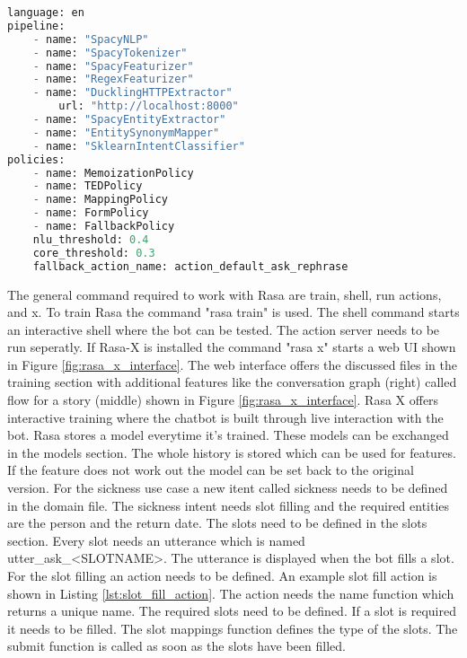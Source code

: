 \begin{lstlisting}[caption={Rasa Configuration}, label={lst:rasa_config},captionpos=b,frame=single,language={Python},commentstyle=\color{mygreen},keywordstyle=\color{blue},
    morekeywords={language, pipeline, policies, name}]                
language: en
pipeline: 
    - name: "SpacyNLP"
    - name: "SpacyTokenizer"
    - name: "SpacyFeaturizer"
    - name: "RegexFeaturizer"
    - name: "DucklingHTTPExtractor"
        url: "http://localhost:8000"
    - name: "SpacyEntityExtractor"
    - name: "EntitySynonymMapper"
    - name: "SklearnIntentClassifier"
policies:
    - name: MemoizationPolicy
    - name: TEDPolicy
    - name: MappingPolicy
    - name: FormPolicy
    - name: FallbackPolicy
    nlu_threshold: 0.4
    core_threshold: 0.3
    fallback_action_name: action_default_ask_rephrase
\end{lstlisting} 
The general command required to work with Rasa are train, shell, run actions, and x.
To train Rasa the command "rasa train" is used. 
The shell command starts an interactive shell where the bot can be tested.
The action server needs to be run seperatly.
If Rasa-X is installed the command "rasa x" starts a web UI shown in Figure \ref{fig:rasa_x_interface}.
The web interface offers the discussed files in the training section with additional
features like the conversation graph (right) called flow for a story (middle) shown in Figure \ref{fig:rasa_x_interface}.
Rasa X offers interactive training where the chatbot is built through live interaction 
with the bot. 
Rasa stores a model everytime it's trained.
These models can be exchanged in the models section.
The whole history is stored which can be used for features.
If the feature does not work out the model can be set back to 
the original version.
For the sickness use case a new itent called sickness needs to be defined in the 
domain file.
The sickness intent needs slot filling and the required entities are the 
person and the return date. 
The slots need to be defined in the slots section.
Every slot needs an utterance which is named utter\_ask\_<SLOTNAME>.
The utterance is displayed when the bot fills a slot.
For the slot filling an action needs to be defined.
An example slot fill action is shown in Listing \ref{lst:slot_fill_action}.
The action needs the name function which returns a unique name.
The required slots need to be defined.
If a slot is required it needs to be filled.
The slot mappings function defines the type of the slots.
The submit function is called as soon as the slots have been filled.

